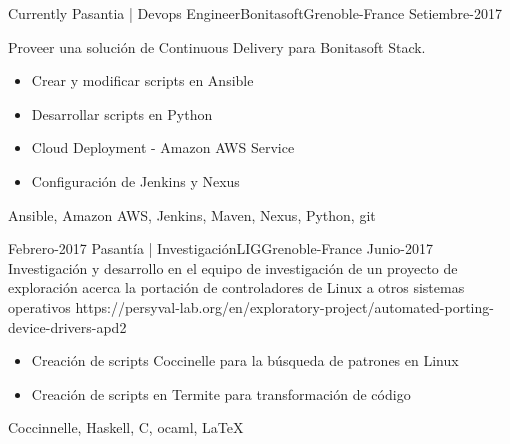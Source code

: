 \begin{experiences}
  \experience
    {Currently}   {Pasantia | Devops Engineer}{Bonitasoft}{Grenoble-France}
    {Setiembre-2017}
                    {Proveer una solución de Continuous Delivery para Bonitasoft Stack.
                    \begin{itemize}
                        \item Crear y modificar scripts en Ansible
                        \item Desarrollar scripts en Python
                        \item Cloud Deployment - Amazon AWS Service
                        \item Configuración de Jenkins y Nexus
                      \end{itemize}}
                    {Ansible, Amazon AWS, Jenkins, Maven, Nexus, Python, git}
  \emptySeparator

    \projectexperiences
    {Febrero-2017}   {Pasantía | Investigación}{LIG}{Grenoble-France}
    {Junio-2017}
                    {
                    Investigación y desarrollo en el equipo de investigación de un proyecto
                    de exploración acerca la portación de controladores de Linux a otros sistemas
                    operativos \tiny{https://persyval-lab.org/en/exploratory-project/automated-porting-device-drivers-apd2}
                    }
                    {
                    \begin{itemize}
                        \item Creación de scripts Coccinelle para la búsqueda de patrones en Linux
                        \item Creación de scripts en Termite para transformación de código
                      \end{itemize}
                     }
                    {Coccinnelle, Haskell, C, ocaml, \LaTeX}
  \emptySeparator


\end{experiences}
